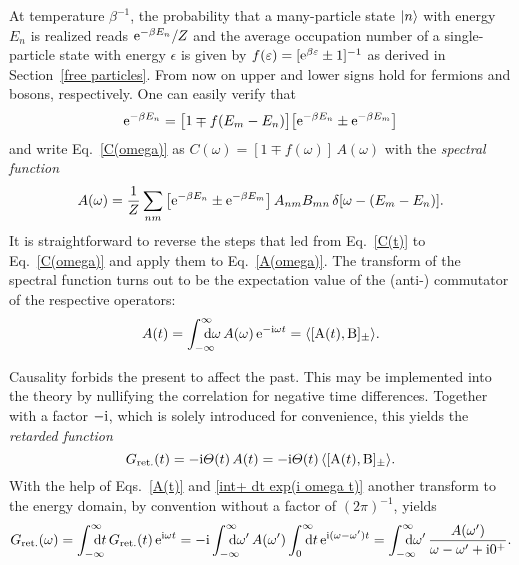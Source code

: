 At temperature $\beta^{-1}$, the probability that a many-particle state $|n\rangle$
with energy $E_n$ is realized reads $\mathrm e^{-\beta E_n} / Z$ and the average
occupation number of a single-particle state with energy $\epsilon$ is given by
$f(\varepsilon) = [\mathrm e^{\beta \varepsilon} \pm 1]^{-1}$ as derived in Section~\ref{free
particles}. From now on upper and lower signs hold for fermions and bosons,
respectively. One can easily verify that
%
\begin{equation*}
    \mathrm e^{-\beta E_n} =
    \big[ 1 \mp f(E_m - E_n) \big]
    \big[ \mathrm e^{-\beta E_n} \pm \mathrm e^{-\beta E_m} \big]
\end{equation*}
%
and write Eq.~\ref{C(omega)} as $C(\omega) = [1 \mp f(\omega)] \, A(\omega)$
with the \emph{spectral function}
%
\begin{equation} \label{A(omega)}
    A(\omega) = \frac 1 Z \sum_{n m} \big[
        \mathrm e^{-\beta E_n} \pm \mathrm e^{-\beta E_m}
    \big] \, A_{n m} B_{m n} \, \delta[\omega - (E_m - E_n)].
\end{equation}
%
It is straightforward to reverse the steps that led from Eq.~\ref{C(t)} to
Eq.~\ref{C(omega)} and apply them to Eq.~\ref{A(omega)}. The 
transform of the spectral function turns out to be the expectation value of the
(anti-) commutator of the respective operators:
%
\begin{equation} \label{A(t)}
    A(t) = \int \from{-\infty} \till \infty \D \omega \,
    A(\omega) \, \E^{-\I \omega t} =
    \av{[\op A(t), \op B]_\pm}.
\end{equation}

Causality forbids the present to affect the past. This may be implemented into
the theory by nullifying the correlation for negative time differences. Together
with a factor $-\mathrm i$, which is solely introduced for convenience, this yields the
\emph{retarded  function}
%
\begin{equation} \label{G_ret(t)}
    G \sb{\text{ret.}} (t) = -\mathrm i \varTheta(t) \, A(t) =
    -\mathrm i \varTheta(t) \, \langle[\mathrm A(t), \mathrm B]_\pm\rangle.
\end{equation}
%
With the help of Eqs.~\ref{A(t)} and \ref{int+ dt exp(i omega t)} another
 transform to the energy domain, by convention without a factor of
$(2 \pi)^{-1}$, yields
%
\begin{equation} \label{G_ret(omega)}
    G \sub{ret.} (\omega) = \int \from{-\infty} \till \infty \D t \,
    G \sub{ret.} (t) \, \E^{\I \omega t} = -\I
    \int \from{-\infty} \till \infty \D \omega' \, A(\omega')
    \int \from 0 \till \infty \D t \, \E^{\I (\omega - \omega') t} =
    \int \from{-\infty} \till \infty \D \omega' \,
    \frac{A(\omega')}{\omega - \omega' + \I 0^+}.
\end{equation}

